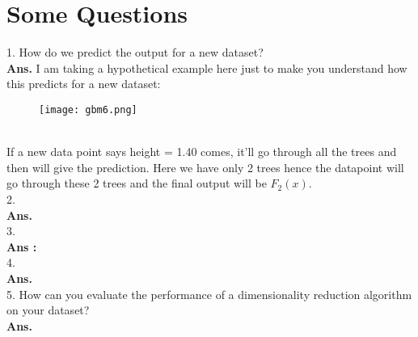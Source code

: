 \documentclass[a4paper, 11pt]{article}
\begin{document}


\section{Some Questions}
1. How do we predict the output for a new dataset?\\
\textbf{Ans.}  I am taking a hypothetical example here just to
make you understand how this predicts for a new dataset:
\begin{figure}[h!]
    \centering
    \texttt{[image: gbm6.png]}
    \label{fig:fig6}
  \end{figure}\\
  If a new data point says height = 1.40 comes, it’ll go through all the trees and then will give the prediction. Here we have only 2 trees hence the datapoint will go through these 2 trees and the final output will be $F_2(x).$ \\

2.\\
\textbf{Ans.} 
\\

3.\\ 
\textbf{Ans :} \\
4.   \\
\textbf{Ans.} \\
5. How can you evaluate the performance of a dimensionality reduction algorithm on your dataset?
\\ \textbf{Ans. } \\
\end{document}
